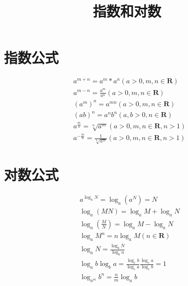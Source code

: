 \documentclass[UTF8,a4paper,10pt, twocolumn]{ctexart}
\title{指数和对数}
\begin{document}
\maketitle

\section{指数公式}
\begin{align}
  &a^{m+n} = a^m*a^n (a>0, m,n\in\mathbf{R}) \\
  &a^{m-n} = \frac{a^m}{a^n} (a>0, m,n\in\mathbf{R}) \\
  &(a^{m})^n = a^{mn} (a>0, m,n\in\mathbf{R}) \\
  &(ab)^{n} = a^{n}b^{n} (a,b>0, n\in\mathbf{R}) \\
  &a^{\frac{m}{n}} = \sqrt[n]{a^{m}} (a>0, m,n\in\mathbf{R}, n>1) \\
  &a^{-\frac{m}{n}} = \frac{1}{\sqrt[n]{a^{m}}} (a>0, m,n\in\mathbf{R}, n>1)
\end{align}

\section{对数公式}
\begin{align}
  &a^{\log_aN} = \log_{a}(a^{N}) = N \\
  &\log_{a}(MN) = \log_{a}M + \log_{a}N \\
  &\log_{a}(\frac{M}{N}) = \log_{a}M - \log_{a}N \\
  &\log_{a}M^{n} = n\log_{a}M (n\in\mathbf{R}) \\
  &\log_{a}N = \frac{\log_{b}N}{\log_{b}a} \\
  &\log_{a}b\log_{b}a = \frac{\log_{c}b}{\log_{c}a}\frac{\log_{c}a}{\log_{c}b} = 1 \\
  &\log_{a^{m}}b^{n} = \frac{n}{m}\log_{a}b 
\end{align}
\end{document}
